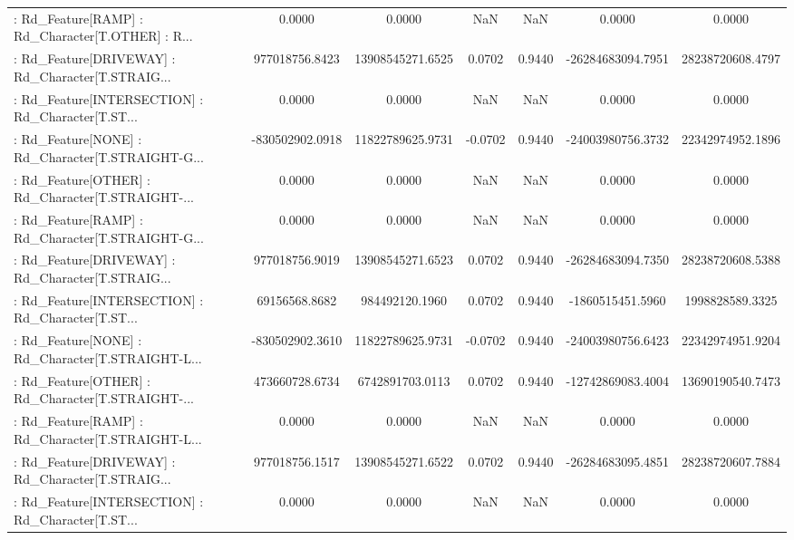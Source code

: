 \begin{longtable}{p{4cm}cccccc}
 : Rd\_Feature[RAMP] : Rd\_Character[T.OTHER] : R... &            0.0000 &            0.0000 &     NaN &          NaN &             0.0000 &            0.0000 \\
 : Rd\_Feature[DRIVEWAY] : Rd\_Character[T.STRAIG... &    977018756.8423 &  13908545271.6525 &  0.0702 &       0.9440 &  -26284683094.7951 &  28238720608.4797 \\
 : Rd\_Feature[INTERSECTION] : Rd\_Character[T.ST... &            0.0000 &            0.0000 &     NaN &          NaN &             0.0000 &            0.0000 \\
 : Rd\_Feature[NONE] : Rd\_Character[T.STRAIGHT-G... &   -830502902.0918 &  11822789625.9731 & -0.0702 &       0.9440 &  -24003980756.3732 &  22342974952.1896 \\
 : Rd\_Feature[OTHER] : Rd\_Character[T.STRAIGHT-... &            0.0000 &            0.0000 &     NaN &          NaN &             0.0000 &            0.0000 \\
 : Rd\_Feature[RAMP] : Rd\_Character[T.STRAIGHT-G... &            0.0000 &            0.0000 &     NaN &          NaN &             0.0000 &            0.0000 \\
 : Rd\_Feature[DRIVEWAY] : Rd\_Character[T.STRAIG... &    977018756.9019 &  13908545271.6523 &  0.0702 &       0.9440 &  -26284683094.7350 &  28238720608.5388 \\
 : Rd\_Feature[INTERSECTION] : Rd\_Character[T.ST... &     69156568.8682 &    984492120.1960 &  0.0702 &       0.9440 &   -1860515451.5960 &   1998828589.3325 \\
 : Rd\_Feature[NONE] : Rd\_Character[T.STRAIGHT-L... &   -830502902.3610 &  11822789625.9731 & -0.0702 &       0.9440 &  -24003980756.6423 &  22342974951.9204 \\
 : Rd\_Feature[OTHER] : Rd\_Character[T.STRAIGHT-... &    473660728.6734 &   6742891703.0113 &  0.0702 &       0.9440 &  -12742869083.4004 &  13690190540.7473 \\
 : Rd\_Feature[RAMP] : Rd\_Character[T.STRAIGHT-L... &            0.0000 &            0.0000 &     NaN &          NaN &             0.0000 &            0.0000 \\
 : Rd\_Feature[DRIVEWAY] : Rd\_Character[T.STRAIG... &    977018756.1517 &  13908545271.6522 &  0.0702 &       0.9440 &  -26284683095.4851 &  28238720607.7884 \\
 : Rd\_Feature[INTERSECTION] : Rd\_Character[T.ST... &            0.0000 &            0.0000 &     NaN &          NaN &             0.0000 &            0.0000 \\

\end{longtable}
